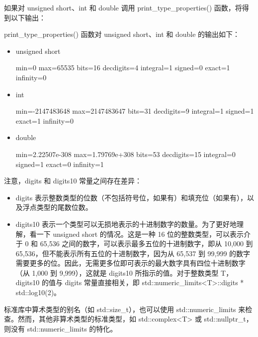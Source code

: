 如果对 unsigned short、int 和 double 调用 print\_type\_properties() 函数，将得到以下输出：

print\_type\_properties() 函数对 unsigned short、int 和 double 的输出如下：

\begin{itemize}
\item
unsigned short

\begin{shell}
min=0
max=65535
bits=16
decdigits=4
integral=1
signed=0
exact=1
infinity=0
\end{shell}

\item
int

\begin{shell}
min=-2147483648
max=2147483647
bits=31
decdigits=9
integral=1
signed=1
exact=1
infinity=0
\end{shell}

\item
double

\begin{shell}
min=2.22507e-308
max=1.79769e+308
bits=53
decdigits=15
integral=0
signed=1
exact=0
infinity=1
\end{shell}
\end{itemize}

注意，digits 和 digits10 常量之间存在差异：

\begin{itemize}
\item
digits 表示整数类型的位数（不包括符号位，如果有）和填充位（如果有），以及浮点类型的尾数位数。

\item
digits10 表示一个类型可以无损地表示的十进制数字的数量。为了更好地理解，看一下 unsigned short 的情况。这是一种 16 位的整数类型，可以表示介于 0 和 65,536 之间的数字，可以表示最多五位的十进制数字，即从 10,000 到 65,536，但不能表示所有五位的十进制数字，因为从 65,537 到 99,999 的数字需要更多的位。因此，无需更多位即可表示的最大数字具有四位十进制数字（从 1,000 到 9,999），这就是 digits10 所指示的值。对于整数类型 T，digits10 的值与 digits 常量直接相关，即 std::numeric\_limits<T>::digits * std::log10(2)。
\end{itemize}

标准库中算术类型的别名（如 std::size\_t），也可以使用 std::numeric\_limits 来检查。然而，其他非算术类型的标准类型，如 std::complex<T> 或 std::nullptr\_t，则没有 std::numeric\_limits 的特化。

